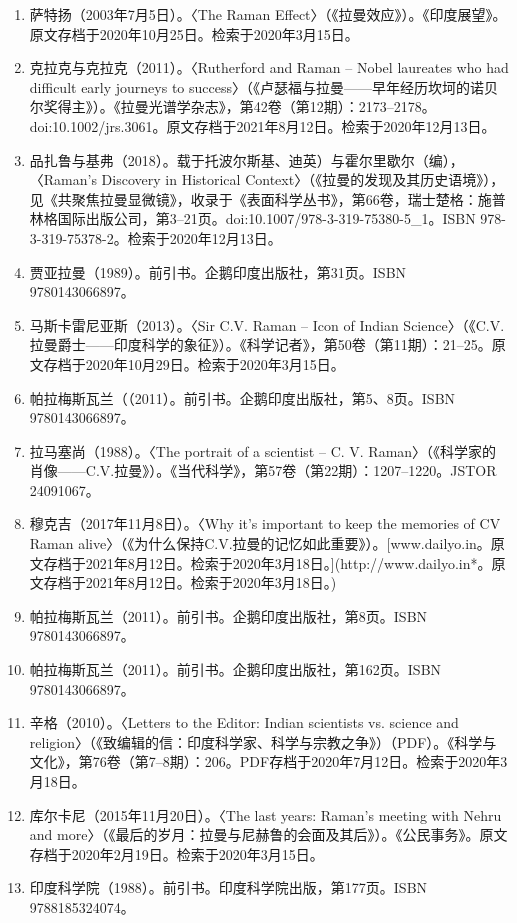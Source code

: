 \begin{enumerate}
\item 萨特扬（2003年7月5日）。〈The Raman Effect〉（《拉曼效应》）。《印度展望》。原文存档于2020年10月25日。检索于2020年3月15日。
\item 克拉克与克拉克（2011）。〈Rutherford and Raman – Nobel laureates who had difficult early journeys to success〉（《卢瑟福与拉曼——早年经历坎坷的诺贝尔奖得主》）。《拉曼光谱学杂志》，第42卷（第12期）：2173–2178。doi:10.1002/jrs.3061。原文存档于2021年8月12日。检索于2020年12月13日。
\item 品扎鲁与基弗（2018）。载于托波尔斯基、迪英）与霍尔里歇尔（编），〈Raman's Discovery in Historical Context〉（《拉曼的发现及其历史语境》），见《共聚焦拉曼显微镜》，收录于《表面科学丛书》，第66卷，瑞士楚格：施普林格国际出版公司，第3–21页。doi:10.1007/978-3-319-75380-5_1。ISBN 978-3-319-75378-2。检索于2020年12月13日。
\item 贾亚拉曼（1989）。前引书。企鹅印度出版社，第31页。ISBN 9780143066897。
\item 马斯卡雷尼亚斯（2013）。〈Sir C.V. Raman – Icon of Indian Science〉（《C.V.拉曼爵士——印度科学的象征》）。《科学记者》，第50卷（第11期）：21–25。原文存档于2020年10月29日。检索于2020年3月15日。
\item 帕拉梅斯瓦兰（（2011）。前引书。企鹅印度出版社，第5、8页。ISBN 9780143066897。
\item 拉马塞尚（1988）。〈The portrait of a scientist – C. V. Raman〉（《科学家的肖像——C.V.拉曼》）。《当代科学》，第57卷（第22期）：1207–1220。JSTOR 24091067。
\item 穆克吉（2017年11月8日）。〈Why it's important to keep the memories of CV Raman alive〉（《为什么保持C.V.拉曼的记忆如此重要》）。[www.dailyo.in。原文存档于2021年8月12日。检索于2020年3月18日。](http://www.dailyo.in*。原文存档于2021年8月12日。检索于2020年3月18日。)
\item 帕拉梅斯瓦兰（2011）。前引书。企鹅印度出版社，第8页。ISBN 9780143066897。
\item 帕拉梅斯瓦兰（2011）。前引书。企鹅印度出版社，第162页。ISBN 9780143066897。
\item 辛格（2010）。〈Letters to the Editor: Indian scientists vs. science and religion〉（《致编辑的信：印度科学家、科学与宗教之争》）（PDF）。《科学与文化》，第76卷（第7–8期）：206。PDF存档于2020年7月12日。检索于2020年3月18日。
\item 库尔卡尼（2015年11月20日）。〈The last years: Raman's meeting with Nehru and more〉（《最后的岁月：拉曼与尼赫鲁的会面及其后》）。《公民事务》。原文存档于2020年2月19日。检索于2020年3月15日。
\item 印度科学院（1988）。前引书。印度科学院出版，第177页。ISBN 9788185324074。

\end{enumerate}
